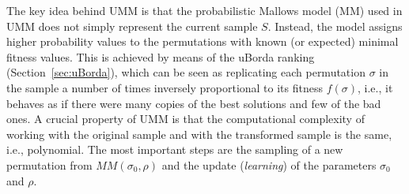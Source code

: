 \documentclass[runningheads]{llncs}
\begin{document}
The key idea behind UMM is that the probabilistic Mallows model (MM) used in
UMM does not simply represent the current sample $S$. Instead, the model
assigns higher probability values to the permutations with known (or expected)
minimal fitness values. This is achieved by means of the uBorda ranking
(Section~\ref{sec:uBorda}), which can be seen as replicating each permutation
$\sigma$ in the sample a number of times inversely proportional to its fitness
$f(\sigma)$, i.e., it behaves as if there were many copies of the best
solutions and few of the bad ones. A crucial property of UMM is that the
computational complexity of working with the original sample and with the
transformed sample is the same, i.e., polynomial. The most important steps are
the sampling of a new permutation from $MM(\sigma_0,\rho)$ and the update
(\emph{learning}) of the parameters $\sigma_0$ and $\rho$.





\end{document}

